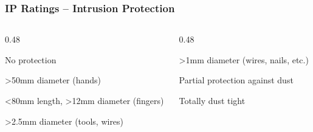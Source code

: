 \begin{frame}
    \frametitle{IP Ratings -- Intrusion Protection}

	\begin{columns}
        \begin{column}{0.48\linewidth}
            \begin{description}[<+- | alert@+>]
                \item[0]{No protection}
                \item[1]{>50mm diameter (hands)}
                \item[2]{<80mm length, >12mm diameter (fingers)}
                \item[3]{>2.5mm diameter (tools, wires)}
            \end{description}
        \end{column}
        \begin{column}{0.48\linewidth}
            \begin{description}[<+- | alert@+>]
                \item[4]{>1mm diameter (wires, nails, etc.)}
                \item[5]{Partial protection against dust}
                \item[6]{Totally dust tight}
            \end{description}
        \end{column}
	\end{columns}
\end{frame}

